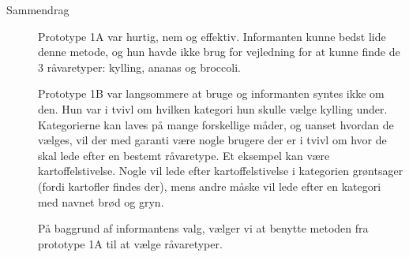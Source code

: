 \begin{description}
\item[Sammendrag] Prototype 1A var hurtig, nem og effektiv. Informanten kunne bedst lide denne metode, og hun havde ikke brug for vejledning for at kunne finde de 3 råvaretyper: kylling, ananas og broccoli.

Prototype 1B var langsommere at bruge og informanten syntes ikke om den. Hun var i tvivl om hvilken kategori hun skulle vælge kylling under. Kategorierne kan laves på mange forskellige måder, og uanset hvordan de vælges, vil der med garanti være nogle brugere der er i tvivl om hvor de skal lede efter en bestemt råvaretype. Et eksempel kan være kartoffelstivelse. Nogle vil lede efter kartoffelstivelse i kategorien grøntsager (fordi kartofler findes der), mens andre måske vil lede efter en kategori med navnet brød og gryn.

På baggrund af informantens valg, vælger vi at benytte metoden fra prototype 1A til at vælge råvaretyper.
\end{description}
